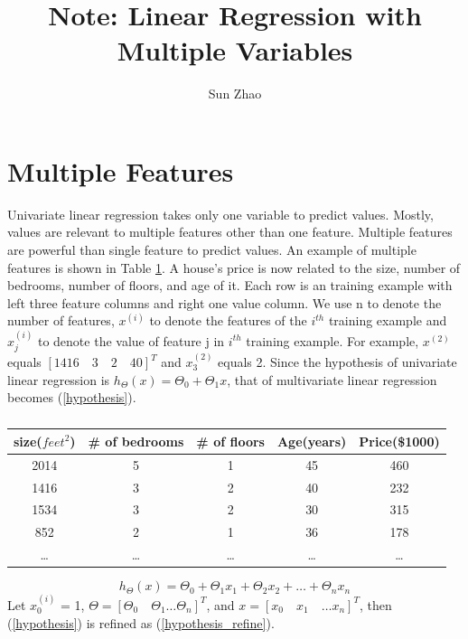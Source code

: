 \documentclass{article}
\title{Note: Linear Regression with Multiple Variables}
\author{Sun Zhao}
\begin{document}
\maketitle
\newpage

\section{Multiple Features}
Univariate linear regression takes only one variable to predict values. Mostly, values are relevant to multiple features other than one feature. Multiple features are powerful than single
 feature to predict values. An example of multiple features is shown in Table \ref{multivate_feature_example}. A house's price is now related to the size, number of bedrooms, number of floors, and age of it. Each row is an training example with left three feature columns and right one value column. We use n to denote the number of features, $x^{(i)}$ to denote the features of the $i^{th}$ training example and $x^{(i)}_{j}$ to denote the value of feature j in $i^{th}$ training example. For example, $x^{(2)}$ equals $[1416 \quad 3 \quad 2 \quad 40]^{T}$ and $x^{(2)}_{3}$ equals 2. Since the hypothesis of univariate linear regression is $h_{\Theta}(x) = \Theta_{0} + \Theta_{1}x$, that of multivariate linear regression becomes (\ref{hypothesis}).

\begin{table}[ht]
\begin{center}
\caption{}\label{multivate_feature_example}
\begin{tabular}{c|c|c|c|c}
\hline
size($feet^{2}$) & \# of bedrooms & \# of floors & Age(years) & Price(\$1000)\\
\hline
2014    &   5   &   1   &   45  &   460\\
1416    &   3   &   2   &   40  &   232\\
1534    &   3   &   2   &   30  &   315\\
852     &   2   &   1   &   36  &   178\\
\ldots & \ldots &  \ldots & \ldots & \ldots\\
\end{tabular}
\end{center}
\end{table}

\begin{equation}\label{hypothesis}
   h_{\Theta}(x) = \Theta_{0} + \Theta_{1}x_{1} + \Theta_{2}x_{2} + \ldots + \Theta_{n}x_{n}
\end{equation}
Let $x^{(i)}_{0}$ = 1, $\Theta = [\Theta_{0} \quad \Theta_{1} \ldots \Theta_{n}]^{T}$, and $x = [x_{0} \quad x_{1} \quad \ldots x_{n}]^{T}$, then (\ref{hypothesis}) is refined as (\ref{hypothesis_refine}).
\end{document}
